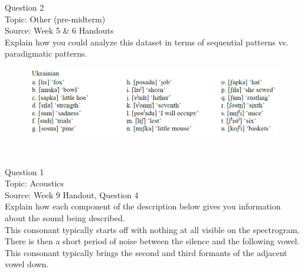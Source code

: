\documentclass[12pt]{article}
\begin{document}
{\large Question 2}\\

Topic: Other (pre-midterm)\\
Source: Week 5 \& 6 Handouts\\

Explain how you could analyze this dataset in terms of sequential patterns vs. paradigmatic patterns.\\

\begin{figure}[H]
\includegraphics{../images/ukrainian.png}
\end{figure}

\newpage

\begin{center}
\textbf{{\color{red}{\HUGE END OF EXAM}}}\\

\end{center}
\newpage

\begin{center}
\textbf{{\color{blue}{\HUGE START OF EXAM\\}}}

\textbf{{\color{blue}{\HUGE Student ID: 74115\\}}}

\textbf{{\color{blue}{\HUGE 4:50\\}}}

\end{center}
\newpage

{\large Question 1}\\

Topic: Acoustics\\
Source: Week 9 Handout, Question 4\\

Explain how each component of the description below gives you information about the sound being described.\\

This consonant typically starts off with nothing at all visible on the spectrogram. There is then a short period of noise between the silence and the following vowel. This consonant typically brings the second and third formants of the adjacent vowel down.
\end{document}
